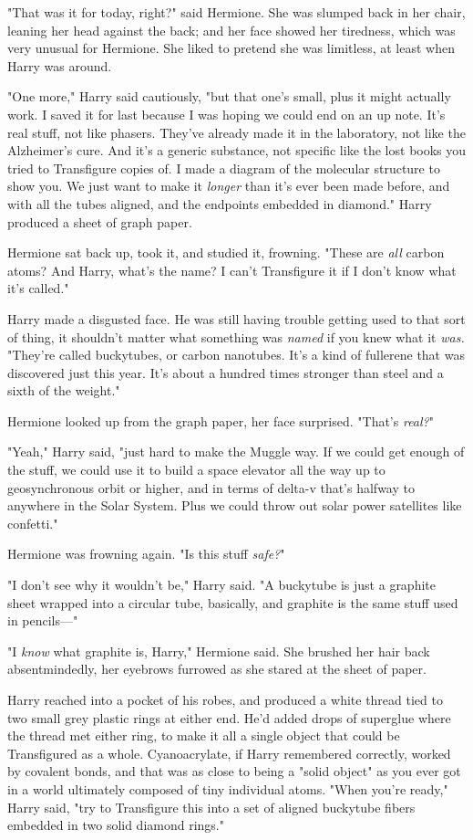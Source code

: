 "That was it for today, right?" said Hermione. She was slumped back in her
chair, leaning her head against the back; and her face showed her tiredness,
which was very unusual for Hermione. She liked to pretend she was limitless, at
least when Harry was around.

"One more," Harry said cautiously, "but that one's small, plus it might
actually work. I saved it for last because I was hoping we could end on an up
note. It's real stuff, not like phasers. They've already made it in the
laboratory, not like the Alzheimer's cure. And it's a generic substance, not
specific like the lost books you tried to Transfigure copies of. I made a
diagram of the molecular structure to show you. We just want to make it
\emph{longer} than it's ever been made before, and with all the tubes aligned,
and the endpoints embedded in diamond." Harry produced a sheet of graph paper.

Hermione sat back up, took it, and studied it, frowning. "These are \emph{all}
carbon atoms? And Harry, what's the name? I can't Transfigure it if I don't
know what it's called."

Harry made a disgusted face. He was still having trouble getting used to that
sort of thing, it shouldn't matter what something was \emph{named} if you knew
what it \emph{was.} "They're called buckytubes, or carbon nanotubes. It's a
kind of fullerene that was discovered just this year. It's about a hundred
times stronger than steel and a sixth of the weight."

Hermione looked up from the graph paper, her face surprised. "That's
\emph{real?}"

"Yeah," Harry said, "just hard to make the Muggle way. If we could get enough
of the stuff, we could use it to build a space elevator all the way up to
geosynchronous orbit or higher, and in terms of delta-v that's halfway to
anywhere in the Solar System. Plus we could throw out solar power satellites
like confetti."

Hermione was frowning again. "Is this stuff \emph{safe?}"

"I don't see why it wouldn't be," Harry said. "A buckytube is just a graphite
sheet wrapped into a circular tube, basically, and graphite is the same stuff
used in pencils\mbox{---}"

"I \emph{know} what graphite is, Harry," Hermione said. She brushed her hair
back absentmindedly, her eyebrows furrowed as she stared at the sheet of paper.

Harry reached into a pocket of his robes, and produced a white thread tied to
two small grey plastic rings at either end. He'd added drops of superglue where
the thread met either ring, to make it all a single object that could be
Transfigured as a whole. Cyanoacrylate, if Harry remembered correctly, worked
by covalent bonds, and that was as close to being a "solid object" as you ever
got in a world ultimately composed of tiny individual atoms. "When you're
ready," Harry said, "try to Transfigure this into a set of aligned buckytube
fibers embedded in two solid diamond rings."

